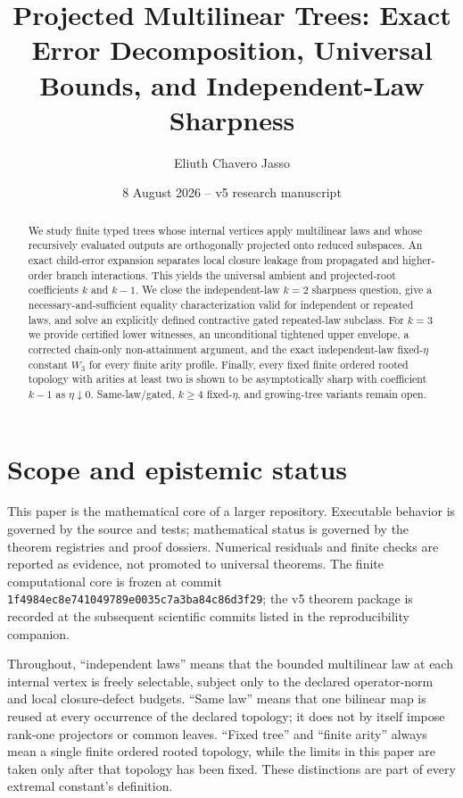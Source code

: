 \documentclass[11pt]{amsart}
\title[Projected multilinear trees]{Projected Multilinear Trees: Exact Error Decomposition, Universal Bounds, and Independent-Law Sharpness}
\author{Eliuth Chavero Jasso}
\date{8 August 2026 -- v5 research manuscript}
\theoremstyle{definition}
\theoremstyle{remark}
\begin{document}
\begin{abstract}
We study finite typed trees whose internal vertices apply multilinear laws and whose recursively evaluated outputs are orthogonally projected onto reduced subspaces. An exact child-error expansion separates local closure leakage from propagated and higher-order branch interactions. This yields the universal ambient and projected-root coefficients $k$ and $k-1$. We close the independent-law $k=2$ sharpness question, give a necessary-and-sufficient equality characterization valid for independent or repeated laws, and solve an explicitly defined contractive gated repeated-law subclass. For $k=3$ we provide certified lower witnesses, an unconditional tightened upper envelope, a corrected chain-only non-attainment argument, and the exact independent-law fixed-$\eta$ constant $W_3$ for every finite arity profile. Finally, every fixed finite ordered rooted topology with arities at least two is shown to be asymptotically sharp with coefficient $k-1$ as $\eta\downarrow0$. Same-law/gated, $k\ge4$ fixed-$\eta$, and growing-tree variants remain open.
\end{abstract}
\maketitle

\section{Scope and epistemic status}

This paper is the mathematical core of a larger repository. Executable
behavior is governed by the source and tests; mathematical status is governed
by the theorem registries and proof dossiers. Numerical residuals and finite
checks are reported as evidence, not promoted to universal theorems. The
finite computational core is frozen at commit
\texttt{1f4984ec8e741049789e0035c7a3ba84c86d3f29}; the v5 theorem package is
recorded at the subsequent scientific commits listed in the reproducibility
companion.

Throughout, ``independent laws'' means that the bounded multilinear law at
each internal vertex is freely selectable, subject only to the declared
operator-norm and local closure-defect budgets. ``Same law'' means that one
bilinear map is reused at every occurrence of the declared topology; it does
not by itself impose rank-one projectors or common leaves. ``Fixed tree'' and
``finite arity'' always mean a single finite ordered rooted topology, while
the limits in this paper are taken only after that topology has been fixed.
These distinctions are part of every extremal constant's definition.
\end{document}
